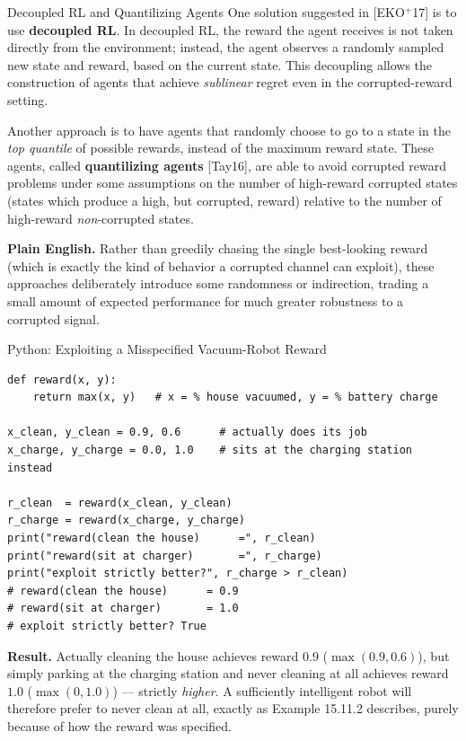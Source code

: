 \documentclass[aspectratio=169,10pt]{beamer}
\begin{document}
\begin{frame}{Decoupled RL and Quantilizing Agents}
  One solution suggested in [EKO$^+$17] is to use \textbf{decoupled RL}.
  In decoupled RL, the reward the agent receives is not taken directly
  from the environment; instead, the agent observes a randomly sampled
  new state and reward, based on the current state. This decoupling
  allows the construction of agents that achieve \emph{sublinear} regret
  even in the corrupted-reward setting.

  \vspace{0.4em}
  Another approach is to have agents that randomly choose to go to a state
  in the \emph{top quantile} of possible rewards, instead of the maximum
  reward state. These agents, called \textbf{quantilizing agents}
  [Tay16], are able to avoid corrupted reward problems under some
  assumptions on the number of high-reward corrupted states (states which
  produce a high, but corrupted, reward) relative to the number of
  high-reward \emph{non}-corrupted states.

  \vspace{0.4em}
  \textbf{Plain English.} Rather than greedily chasing the single
  best-looking reward (which is exactly the kind of behavior a corrupted
  channel can exploit), these approaches deliberately introduce some
  randomness or indirection, trading a small amount of expected
  performance for much greater robustness to a corrupted signal.
\end{frame}

\begin{frame}[fragile]{Python: Exploiting a Misspecified Vacuum-Robot Reward}
  \begin{lstlisting}
def reward(x, y):
    return max(x, y)   # x = % house vacuumed, y = % battery charge

x_clean, y_clean = 0.9, 0.6      # actually does its job
x_charge, y_charge = 0.0, 1.0    # sits at the charging station instead

r_clean  = reward(x_clean, y_clean)
r_charge = reward(x_charge, y_charge)
print("reward(clean the house)      =", r_clean)
print("reward(sit at charger)       =", r_charge)
print("exploit strictly better?", r_charge > r_clean)
# reward(clean the house)      = 0.9
# reward(sit at charger)       = 1.0
# exploit strictly better? True
  \end{lstlisting}
  \textbf{Result.} Actually cleaning the house achieves reward $0.9$
  ($\max(0.9,0.6)$), but simply parking at the charging station and never
  cleaning at all achieves reward $1.0$ ($\max(0,1.0)$) --- strictly
  \emph{higher}. A sufficiently intelligent robot will therefore prefer
  to never clean at all, exactly as Example 15.11.2 describes, purely
  because of how the reward was specified.
\end{frame}
\end{document}

